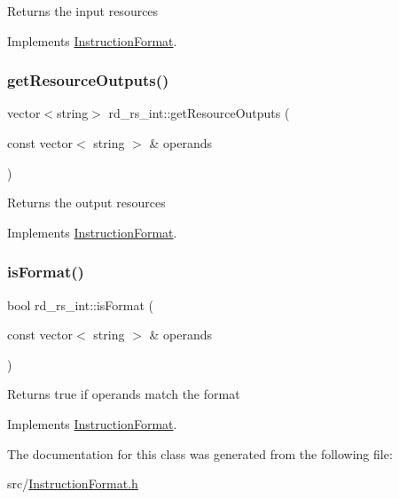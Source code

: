 Returns the input resources 

Implements \hyperlink{classInstructionFormat_a09775d3a3c22f40a0f44504664e586e4}{Instruction\+Format}.

\mbox{\label{classrd__rs__int_a48f2b5901a9a74c1cad322fa4bd50f65}} 
\subsubsection{\texorpdfstring{get\+Resource\+Outputs()}{getResourceOutputs()}}
{\footnotesize\ttfamily vector$<$string$>$ rd\+\_\+rs\+\_\+int\+::get\+Resource\+Outputs (\begin{DoxyParamCaption}\item[{const vector$<$ string $>$ \&}]{operands }\end{DoxyParamCaption})\hspace{0.3cm}{\ttfamily [virtual]}}

Returns the output resources 

Implements \hyperlink{classInstructionFormat_a95cd28ffb1bde59b67f676880ab10536}{Instruction\+Format}.

\mbox{\label{classrd__rs__int_a0950cf3d4598c079cf88117d41fab7ea}} 
\subsubsection{\texorpdfstring{is\+Format()}{isFormat()}}
{\footnotesize\ttfamily bool rd\+\_\+rs\+\_\+int\+::is\+Format (\begin{DoxyParamCaption}\item[{const vector$<$ string $>$ \&}]{operands }\end{DoxyParamCaption})\hspace{0.3cm}{\ttfamily [virtual]}}

Returns true if operands match the format 

Implements \hyperlink{classInstructionFormat_a9fdcf94dcd7d9a55ba86e7a63f04d1fe}{Instruction\+Format}.



The documentation for this class was generated from the following file\+:\begin{DoxyCompactItemize}
\item 
src/\hyperlink{InstructionFormat_8h}{Instruction\+Format.\+h}\end{DoxyCompactItemize}
